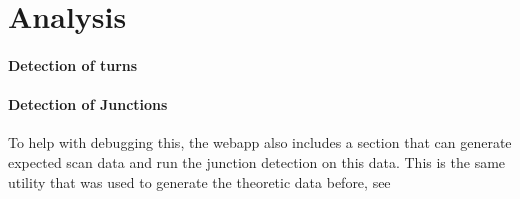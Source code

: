 \section{Analysis}
\label{sec:analysis}

\paragraph{Detection of turns}

\paragraph{Detection of Junctions}
To help with debugging this, the webapp also includes a section that can generate expected scan data and run the junction detection on this data. This is the same utility that was used to generate the theoretic data before, see %